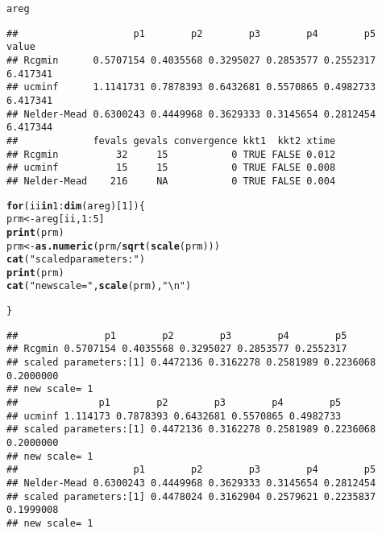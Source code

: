 \documentclass[11pt]{article}\usepackage[]{graphicx}\usepackage[]{color}
\makeatletter
\newcommand{\hlnum}[1]{\textcolor[rgb]{0.686,0.059,0.569}{#1}}%
\newcommand{\hlstr}[1]{\textcolor[rgb]{0.192,0.494,0.8}{#1}}%
\newcommand{\hlopt}[1]{\textcolor[rgb]{0,0,0}{#1}}%
\newcommand{\hlstd}[1]{\textcolor[rgb]{0.345,0.345,0.345}{#1}}%
\newcommand{\hlkwa}[1]{\textcolor[rgb]{0.161,0.373,0.58}{\textbf{#1}}}%
\newcommand{\hlkwb}[1]{\textcolor[rgb]{0.69,0.353,0.396}{#1}}%
\newcommand{\hlkwd}[1]{\textcolor[rgb]{0.737,0.353,0.396}{\textbf{#1}}}%
\newenvironment{kframe}{%
 \def\at@end@of@kframe{}%
 \ifinner\ifhmode%
  \def\at@end@of@kframe{\end{minipage}}%
  \begin{minipage}{\columnwidth}%
 \fi\fi%
 \def\FrameCommand##1{\hskip\@totalleftmargin \hskip-\fboxsep
 \colorbox{shadecolor}{##1}\hskip-\fboxsep
     \hskip-\linewidth \hskip-\@totalleftmargin \hskip\columnwidth}%
 \MakeFramed {\advance\hsize-\width
   \@totalleftmargin\z@ \linewidth\hsize
   \@setminipage}}%
 {\par\unskip\endMakeFramed%
 \at@end@of@kframe}
\newenvironment{knitrout}{}{} %
\makeatother
\begin{document}
\begin{knitrout}
\begin{kframe}
{\ttfamily\noindent\color{warningcolor}{\#\# Warning in log(x/sc): NaNs produced}}

{\ttfamily\noindent\color{warningcolor}{\#\# Warning in Rcgminu(par = spar, fn = efn, gr = egr, control = mcontrol, ...): Rcgmin - undefined function}}

{\ttfamily\noindent\color{warningcolor}{\#\# Warning in log(x/sc): NaNs produced}}

{\ttfamily\noindent\color{warningcolor}{\#\# Warning in Rcgminu(par = spar, fn = efn, gr = egr, control = mcontrol, ...): Rcgmin - undefined function}}\begin{alltt}
\hlstd{areg}
\end{alltt}
\begin{verbatim}
##                    p1        p2        p3        p4        p5    value
## Rcgmin      0.5707154 0.4035568 0.3295027 0.2853577 0.2552317 6.417341
## ucminf      1.1141731 0.7878393 0.6432681 0.5570865 0.4982733 6.417341
## Nelder-Mead 0.6300243 0.4449968 0.3629333 0.3145654 0.2812454 6.417344
##             fevals gevals convergence kkt1  kkt2 xtime
## Rcgmin          32     15           0 TRUE FALSE 0.012
## ucminf          15     15           0 TRUE FALSE 0.008
## Nelder-Mead    216     NA           0 TRUE FALSE 0.004
\end{verbatim}
\begin{alltt}
\hlkwa{for} \hlstd{(ii} \hlkwa{in} \hlnum{1}\hlopt{:}\hlkwd{dim}\hlstd{(areg)[}\hlnum{1}\hlstd{])\{}
    \hlstd{prm} \hlkwb{<-} \hlstd{areg[ii,}\hlnum{1}\hlopt{:}\hlnum{5}\hlstd{]}
    \hlkwd{print}\hlstd{(prm)}
    \hlstd{prm}\hlkwb{<-}\hlkwd{as.numeric}\hlstd{(prm}\hlopt{/}\hlkwd{sqrt}\hlstd{(}\hlkwd{scale}\hlstd{(prm)))}
    \hlkwd{cat}\hlstd{(}\hlstr{"scaled parameters:"}\hlstd{)}
    \hlkwd{print}\hlstd{(prm)}
    \hlkwd{cat}\hlstd{(}\hlstr{"new scale="}\hlstd{,} \hlkwd{scale}\hlstd{(prm),}\hlstr{"\textbackslash{}n"}\hlstd{)}

\hlstd{\}}
\end{alltt}
\begin{verbatim}
##               p1        p2        p3        p4        p5
## Rcgmin 0.5707154 0.4035568 0.3295027 0.2853577 0.2552317
## scaled parameters:[1] 0.4472136 0.3162278 0.2581989 0.2236068 0.2000000
## new scale= 1 
##              p1        p2        p3        p4        p5
## ucminf 1.114173 0.7878393 0.6432681 0.5570865 0.4982733
## scaled parameters:[1] 0.4472136 0.3162278 0.2581989 0.2236068 0.2000000
## new scale= 1 
##                    p1        p2        p3        p4        p5
## Nelder-Mead 0.6300243 0.4449968 0.3629333 0.3145654 0.2812454
## scaled parameters:[1] 0.4478024 0.3162904 0.2579621 0.2235837 0.1999008
## new scale= 1
\end{verbatim}
\end{kframe}
\end{knitrout}
\end{document}
